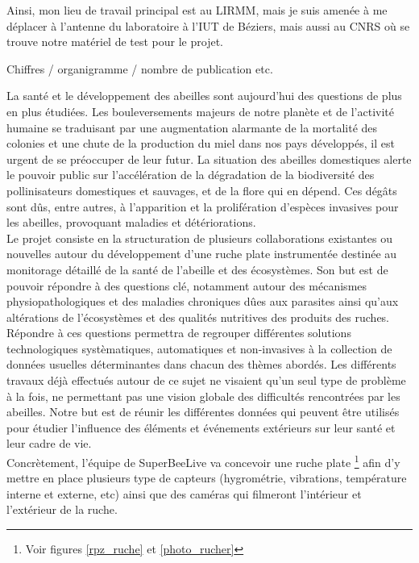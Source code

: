 \documentclass[11pt,french,a4paper]{report}
\begin{document}
\begin{titlepage}
Ainsi, mon lieu de travail principal est au LIRMM, mais je suis amenée à me déplacer à l'antenne du laboratoire à l'IUT de Béziers, 
mais aussi au CNRS où se trouve notre matériel de test pour le projet. 


Chiffres / organigramme / nombre de publication etc. 


\subtitle{Le projet SuperBeeLive}

La santé et le développement des abeilles sont aujourd’hui des questions de plus en plus étudiées. Les bouleversements
majeurs de notre planète et de l’activité humaine se traduisant par une augmentation alarmante de la mortalité
des colonies et une chute de la production du miel dans nos pays développés, il est urgent de se préoccuper de leur futur. 
La situation des abeilles domestiques alerte le pouvoir public sur l’accélération de la dégradation de la biodiversité des 
pollinisateurs domestiques et sauvages, et de la flore qui en dépend. Ces dégâts sont dûs, entre autres, à l’apparition 
et la prolifération d’espèces invasives pour les abeilles, provoquant maladies et détériorations. \\ 

Le projet consiste en la structuration de plusieurs collaborations existantes ou nouvelles autour du développement 
d’une ruche plate instrumentée destinée au monitorage détaillé de la santé de l’abeille et des écosystèmes. Son but est de
pouvoir répondre à des questions clé, notamment autour des mécanismes physiopathologiques et des maladies chroniques 
dûes aux parasites ainsi qu’aux altérations de l’écosystèmes et des qualités nutritives des produits des ruches. \\
Répondre à ces questions permettra de regrouper différentes solutions technologiques systèmatiques, 
automatiques et non-invasives à la collection de données usuelles déterminantes dans chacun des thèmes abordés.
Les différents travaux déjà effectués autour de ce sujet ne visaient qu’un seul type de problème à la fois, 
ne permettant pas une vision globale des difficultés rencontrées par les abeilles. Notre but est de réunir les différentes
données qui peuvent être utilisés pour étudier l’influence des éléments et événements extérieurs sur leur santé et leur cadre de vie.\\

Concrètement, l'équipe de SuperBeeLive va concevoir une ruche plate \footnote{Voir figures \ref{rpz_ruche} et \ref{photo_rucher}} afin d'y mettre 
en place plusieurs type  de capteurs (hygrométrie, vibrations, température interne et externe, etc) ainsi que des caméras qui filmeront 
l'intérieur et l'extérieur de la ruche. \\


\end{titlepage}
\end{document}
